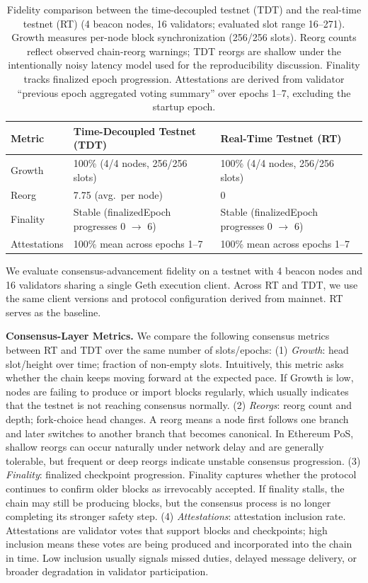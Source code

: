 \begin{table}[t]
\centering
\caption{Fidelity comparison between the time-decoupled testnet (TDT) and the real-time testnet (RT) (4 beacon nodes, 16 validators; evaluated slot range 16--271). Growth measures per-node block synchronization (256/256 slots). Reorg counts reflect observed chain-reorg warnings; TDT reorgs are shallow under the intentionally noisy latency model used for the reproducibility discussion. Finality tracks finalized epoch progression. Attestations are derived from validator ``previous epoch aggregated voting summary'' over epochs 1--7, excluding the startup epoch.}
\label{tab:fidelity}
\begin{tabular}{p{}p{}p{}}
\toprule
\textbf{Metric} & \textbf{Time-Decoupled Testnet (TDT)} & \textbf{Real-Time Testnet (RT)} \\
\midrule
Growth
  & 100\% (4/4 nodes, 256/256 slots) 
  & 100\% (4/4 nodes, 256/256 slots) \\
Reorg    
  & 7.75 (avg.\ per node) 
  & 0 \\
Finality                  
  & Stable (finalizedEpoch progresses 0 $\to$ 6) 
  & Stable (finalizedEpoch progresses 0 $\to$ 6) \\
Attestations
  & 100\% mean across epochs 1--7
  & 100\% mean across epochs 1--7 \\
\bottomrule
\end{tabular}
\end{table}

We evaluate consensus-advancement fidelity on a testnet with 4 beacon nodes and 16 validators sharing a single Geth execution client.
Across RT and TDT, we use the same client versions and protocol configuration derived from mainnet. RT serves as the baseline.

\smallskip
\noindent\textbf{Consensus-Layer Metrics.}
We compare the following consensus metrics between RT and TDT over the same number of slots/epochs:
(1) \emph{Growth}: head slot/height over time; fraction of non-empty slots. Intuitively, this metric asks whether the chain keeps moving forward at the expected pace. If Growth is low, nodes are failing to produce or import blocks regularly, which usually indicates that the testnet is not reaching consensus normally.
(2) \emph{Reorgs}: reorg count and depth; fork-choice head changes. A reorg means a node first follows one branch and later switches to another branch that becomes canonical. In Ethereum PoS, shallow reorgs can occur naturally under network delay and are generally tolerable, but frequent or deep reorgs indicate unstable consensus progression.
(3) \emph{Finality}: finalized checkpoint progression. Finality captures whether the protocol continues to confirm older blocks as irrevocably accepted. If finality stalls, the chain may still be producing blocks, but the consensus process is no longer completing its stronger safety step.
(4) \emph{Attestations}: attestation inclusion rate. Attestations are validator votes that support blocks and checkpoints; high inclusion means these votes are being produced and incorporated into the chain in time. Low inclusion usually signals missed duties, delayed message delivery, or broader degradation in validator participation.

